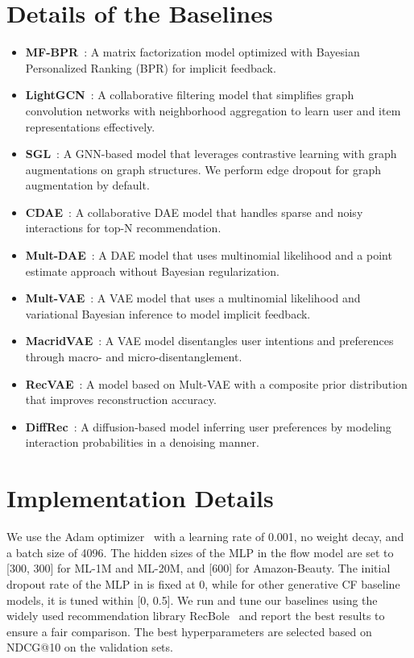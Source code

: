 \documentclass[sigconf]{acmart}
\begin{document}
\section{Details of the Baselines}
\label{sec:baseline}
\begin{itemize}
[leftmargin=*,noitemsep,topsep=1.5pt]
    \item \textbf{MF-BPR}~\cite{rendle2012bpr}: A matrix factorization model optimized with Bayesian Personalized Ranking (BPR) for implicit feedback.
    \item \textbf{LightGCN}~\cite{he2020lightgcn}: A collaborative filtering model that simplifies graph convolution networks with neighborhood aggregation to learn user and item representations effectively.
    \item \textbf{SGL}~\cite{wujc2021self}: A GNN-based model that leverages contrastive learning with graph augmentations on graph structures. We perform edge dropout for graph augmentation by default.
    \item \textbf{CDAE}~\cite{wu2016collaborative}: A collaborative DAE model that handles sparse and noisy interactions for top-N recommendation.
    \item \textbf{Mult-DAE}~\cite{liang2018variational}: A DAE model that uses multinomial likelihood and a point estimate approach without Bayesian regularization.
    \item \textbf{Mult-VAE}~\cite{liang2018variational}: A VAE model that uses a multinomial likelihood and variational Bayesian inference to model implicit feedback.
    \item \textbf{MacridVAE}~\cite{ma2019learning}: A VAE model disentangles user intentions and preferences through macro- and micro-disentanglement.
    \item \textbf{RecVAE}~\cite{shenbin2020recvae}: A model based on Mult-VAE with a composite prior distribution that improves reconstruction accuracy.
    \item \textbf{DiffRec}~\cite{wang2023diffusion}: A diffusion-based model inferring user preferences by modeling interaction probabilities in a denoising manner.
\end{itemize}

\section{Implementation Details}
\label{sec:implementation}
We use the Adam optimizer~\cite{kingma2014adam} with a learning rate of 0.001, no weight decay, and a batch size of 4096. The hidden sizes of the MLP in the flow model are set to [300, 300] for ML-1M and ML-20M, and [600] for Amazon-Beauty. The initial dropout rate of the MLP in \ours is fixed at 0, while for other generative CF baseline models, it is tuned within [0, 0.5].
We run and tune our baselines using the widely used recommendation library RecBole~\cite{zhao2021recbole} and report the best results to ensure a fair comparison. The best hyperparameters are selected based on NDCG@10 on the validation sets.
\end{document}
